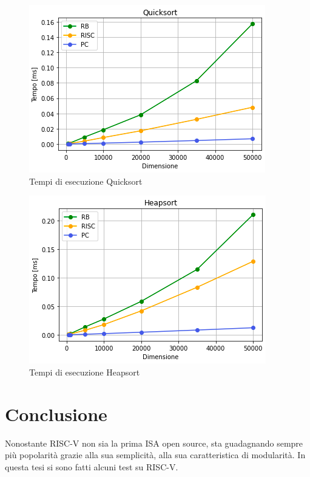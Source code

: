 \documentclass[12pt,a4paper]{report}
\begin{document}
\begin{figure}[ht]
\centering
         \includegraphics[scale=0.8]{Img/GraficiSorting/Quicksort_All.PNG}
         \caption{Tempi di esecuzione Quicksort}
\end{figure}

\begin{figure}[ht]
\centering
         \includegraphics[scale=0.8]{Img/GraficiSorting/Heapsort_All}
         \caption{Tempi di esecuzione Heapsort}
\end{figure}



\chapter{Conclusione}

Nonostante RISC-V non sia la prima ISA open source,  sta guadagnando sempre più popolarità grazie alla sua semplicità, alla sua caratteristica di modularità.  In questa tesi si sono fatti alcuni test su RISC-V.  
\end{document}
